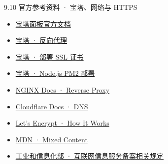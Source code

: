 \begin{frame}{9.10 官方参考资料 · 宝塔、网络与 HTTPS}
  \scriptsize
  \begin{itemize}
    \item \href{https://docs.bt.cn/}{宝塔面板官方文档}
    \item \href{https://docs.bt.cn/user-guide/site/php/site-config/reverse-proxy}{宝塔 · 反向代理}
    \item \href{https://docs.bt.cn/getting-started/deploy-ssl}{宝塔 · 部署 SSL 证书}
    \item \href{https://docs.bt.cn/practical-tutorials/nodejs-pm2-deployment}{宝塔 · Node.js PM2 部署}
    \item \href{https://docs.nginx.com/nginx/admin-guide/web-server/reverse-proxy/}{NGINX Docs · Reverse Proxy}
    \item \href{https://developers.cloudflare.com/dns/}{Cloudflare Docs · DNS}
    \item \href{https://letsencrypt.org/how-it-works/}{Let's Encrypt · How It Works}
    \item \href{https://developer.mozilla.org/en-US/docs/Web/Security/Defenses/Mixed_content}{MDN · Mixed Content}
    \item \href{https://www.miit.gov.cn/}{工业和信息化部 · 互联网信息服务备案相关规定}
  \end{itemize}
\end{frame}
